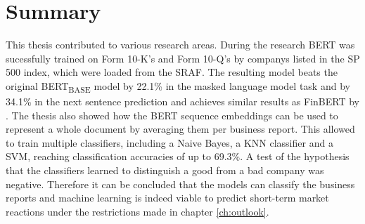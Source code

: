 \chapter{Summary}\label{ch:summary}

This thesis contributed to various research areas.
During the research \ac{BERT} was sucessfully trained on Form 10-K's and Form 10-Q's by companys listed in the \ac{SP} 500 index, which were loaded from the \ac{SRAF}.
The resulting model beats the original BERT\textsubscript{BASE} model by 22.1\% in the masked language model task and by 34.1\% in the next sentence prediction and achieves similar results as FinBERT by \cite{DeSola2019}.
The thesis also showed how the \ac{BERT} sequence embeddings can be used to represent a whole document by averaging them per business report.
This allowed to train multiple classifiers, including a Naive Bayes, a \ac{KNN} classifier and a \ac{SVM}, reaching classification accuracies of up to 69.3\%.
A test of the hypothesis that the classifiers learned to distinguish a good from a bad company was negative.
Therefore it can be concluded that the models can classify the business reports and machine learning is indeed viable to predict short-term market reactions under the restrictions made in chapter \ref{ch:outlook}.
